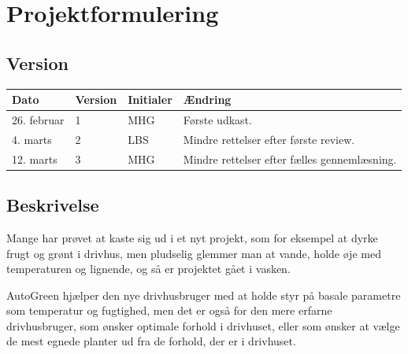\chapter{Projektformulering} \label{ch:Projektformulering}

\section{Version}
\begin{table}[h]
	\centering
	\begin{tabularx}{\textwidth - 2cm}{|l|l| l|X|}
	\hline
	Dato	& Version	& Initialer & Ændring	\\ \hline
	26. februar & 1 & MHG & Første udkast. \\ \hline
	4. marts & 2 & LBS & Mindre rettelser efter første review. \\ \hline
	12. marts & 3 & MHG & Mindre rettelser efter fælles gennemlæsning. \\\hline
	\end{tabularx}
\end{table}
\section{Beskrivelse}
Mange har prøvet at kaste sig ud i et nyt projekt, som for eksempel at dyrke frugt og grønt i drivhus, men pludselig glemmer man at vande, holde øje med temperaturen og lignende, og så er projektet gået i vasken.
 
AutoGreen hjælper den nye drivhusbruger med at holde styr på basale parametre som temperatur og fugtighed, men det er også for den mere erfarne drivhusbruger, som ønsker optimale forhold i drivhuset, eller som ønsker at vælge de mest egnede planter ud fra de forhold, der er i drivhuset.
 

